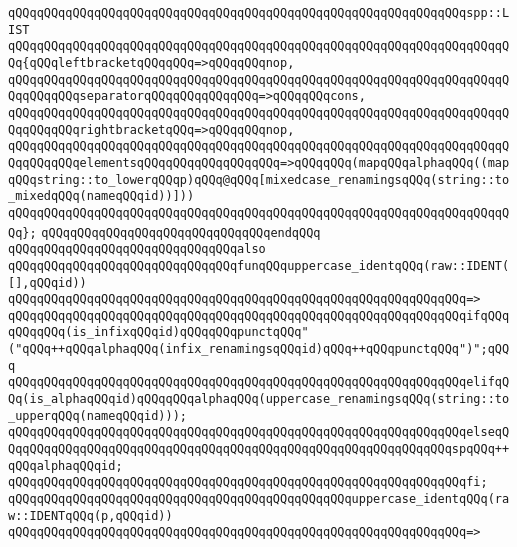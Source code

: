 \verb|qQQqqQQqqQQqqQQqqQQqqQQqqQQqqQQqqQQqqQQqqQQqqQQqqQQqqQQqqQQqqQQqspp::LIST|\newline
\verb|qQQqqQQqqQQqqQQqqQQqqQQqqQQqqQQqqQQqqQQqqQQqqQQqqQQqqQQqqQQqqQQqqQQqqQQq{qQQqleftbracketqQQqqQQq=>qQQqqQQqnop,|\newline
\verb|qQQqqQQqqQQqqQQqqQQqqQQqqQQqqQQqqQQqqQQqqQQqqQQqqQQqqQQqqQQqqQQqqQQqqQQqqQQqqQQqseparatorqQQqqQQqqQQqqQQq=>qQQqqQQqcons,|\newline
\verb|qQQqqQQqqQQqqQQqqQQqqQQqqQQqqQQqqQQqqQQqqQQqqQQqqQQqqQQqqQQqqQQqqQQqqQQqqQQqqQQqrightbracketqQQq=>qQQqqQQqnop,|\newline
\verb|qQQqqQQqqQQqqQQqqQQqqQQqqQQqqQQqqQQqqQQqqQQqqQQqqQQqqQQqqQQqqQQqqQQqqQQqqQQqqQQqelementsqQQqqQQqqQQqqQQqqQQq=>qQQqqQQq(mapqQQqalphaqQQq((mapqQQqstring::to_lowerqQQqp)qQQq@qQQq[mixedcase_renamingsqQQq(string::to_mixedqQQq(nameqQQqid))]))|\newline
\verb|qQQqqQQqqQQqqQQqqQQqqQQqqQQqqQQqqQQqqQQqqQQqqQQqqQQqqQQqqQQqqQQqqQQqqQQq};|\newline
\verb|qQQqqQQqqQQqqQQqqQQqqQQqqQQqqQQqendqQQq|\newline
\newline
\verb|qQQqqQQqqQQqqQQqqQQqqQQqqQQqqQQqalso|\newline
\verb|qQQqqQQqqQQqqQQqqQQqqQQqqQQqqQQqfunqQQquppercase_identqQQq(raw::IDENT([],qQQqid))|\newline
\verb|qQQqqQQqqQQqqQQqqQQqqQQqqQQqqQQqqQQqqQQqqQQqqQQqqQQqqQQqqQQqqQQq=>|\newline
\verb|qQQqqQQqqQQqqQQqqQQqqQQqqQQqqQQqqQQqqQQqqQQqqQQqqQQqqQQqqQQqqQQqifqQQqqQQqqQQq(is_infixqQQqid)qQQqqQQqpunctqQQq"("qQQq++qQQqalphaqQQq(infix_renamingsqQQqid)qQQq++qQQqpunctqQQq")";qQQq|\newline
\verb|qQQqqQQqqQQqqQQqqQQqqQQqqQQqqQQqqQQqqQQqqQQqqQQqqQQqqQQqqQQqqQQqelifqQQq(is_alphaqQQqid)qQQqqQQqalphaqQQq(uppercase_renamingsqQQq(string::to_upperqQQq(nameqQQqid)));|\newline
\verb|qQQqqQQqqQQqqQQqqQQqqQQqqQQqqQQqqQQqqQQqqQQqqQQqqQQqqQQqqQQqqQQqelseqQQqqQQqqQQqqQQqqQQqqQQqqQQqqQQqqQQqqQQqqQQqqQQqqQQqqQQqqQQqqQQqspqQQq++qQQqalphaqQQqid;|\newline
\verb|qQQqqQQqqQQqqQQqqQQqqQQqqQQqqQQqqQQqqQQqqQQqqQQqqQQqqQQqqQQqqQQqfi;|\newline
\newline
\verb|qQQqqQQqqQQqqQQqqQQqqQQqqQQqqQQqqQQqqQQqqQQqqQQquppercase_identqQQq(raw::IDENTqQQq(p,qQQqid))|\newline
\verb|qQQqqQQqqQQqqQQqqQQqqQQqqQQqqQQqqQQqqQQqqQQqqQQqqQQqqQQqqQQqqQQq=>|\newline
